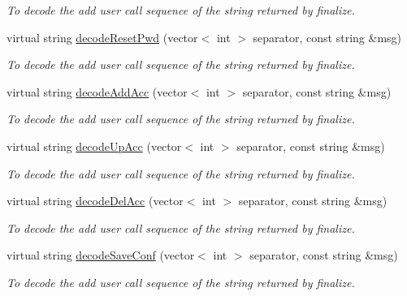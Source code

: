 \begin{DoxyCompactItemize}
\begin{DoxyCompactList}\small\item\em To decode the add user call sequence of the string returned by finalize. \item\end{DoxyCompactList}\item 
virtual string \hyperlink{classUMSMapper_a001ffc8295fb72cd937676973f0520cb}{decodeResetPwd} (vector$<$ int $>$ separator, const string \&msg)
\begin{DoxyCompactList}\small\item\em To decode the add user call sequence of the string returned by finalize. \item\end{DoxyCompactList}\item 
virtual string \hyperlink{classUMSMapper_aad443517f273c610f3ecc38f9e9b817f}{decodeAddAcc} (vector$<$ int $>$ separator, const string \&msg)
\begin{DoxyCompactList}\small\item\em To decode the add user call sequence of the string returned by finalize. \item\end{DoxyCompactList}\item 
virtual string \hyperlink{classUMSMapper_a7be83cb37c8b72e6103c62669381ac5c}{decodeUpAcc} (vector$<$ int $>$ separator, const string \&msg)
\begin{DoxyCompactList}\small\item\em To decode the add user call sequence of the string returned by finalize. \item\end{DoxyCompactList}\item 
virtual string \hyperlink{classUMSMapper_a64e8fa1fe8aa071b405a4c1c67c837ec}{decodeDelAcc} (vector$<$ int $>$ separator, const string \&msg)
\begin{DoxyCompactList}\small\item\em To decode the add user call sequence of the string returned by finalize. \item\end{DoxyCompactList}\item 
virtual string \hyperlink{classUMSMapper_a621d646f3f4525edb990813d31b2ee61}{decodeSaveConf} (vector$<$ int $>$ separator, const string \&msg)
\begin{DoxyCompactList}\small\item\em To decode the add user call sequence of the string returned by finalize. \item\end{DoxyCompactList}\item 

\end{DoxyCompactItemize}
